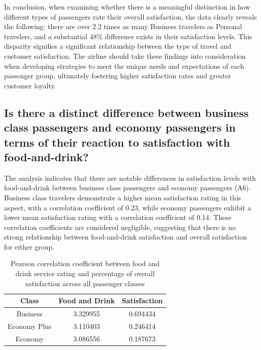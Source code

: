 \documentclass[11pt]{article}
\begin{document}
In conclusion, when examining whether there is a meaningful distinction in how different types of passengers rate their overall satisfaction, the data clearly reveals the following: there are over 2.2 times as many Business travelers as Personal travelers, and a substantial 48\% difference exists in their satisfaction levels. This disparity signifies a significant relationship between the type of travel and customer satisfaction. The airline should take these findings into consideration when developing strategies to meet the unique needs and expectations of each passenger group, ultimately fostering higher satisfaction rates and greater customer loyalty.

    \hypertarget{question-7.5}{%
\subsection{Is there a distinct
difference between business class passengers and economy passengers in
terms of their reaction to satisfaction with
food-and-drink?}\label{question-7.5}}

The analysis indicates that there are notable differences in satisfaction levels with food-and-drink between business class passengers and economy passengers (A6). Business class travelers demonstrate a higher mean satisfaction rating in this aspect, with a correlation coefficient of 0.23, while economy passengers exhibit a lower mean satisfaction rating with a correlation coefficient of 0.14. These correlation coefficients are considered negligible, suggesting that there is no strong relationship between food-and-drink satisfaction and overall satisfaction for either group.

\begin{table}[!h]
    \centering
    \begin{tabular}{|c|c|c|}
        \hline
        Class & Food and Drink  &   Satisfaction \\
        \hline
        Business  &      3.329955   &     0.694434 \\
        \hline
        Economy Plus  &      3.110403   &     0.246414 \\
        \hline
        Economy  &      3.086556   &     0.187673 \\
        \hline
    \end{tabular}
    \caption{\centering Pearson correlation coefficient between food and drink service rating and percentage of overall satisfaction across all passenger classes}
    \label{tab:7-4-1}
\end{table}
\end{document}
